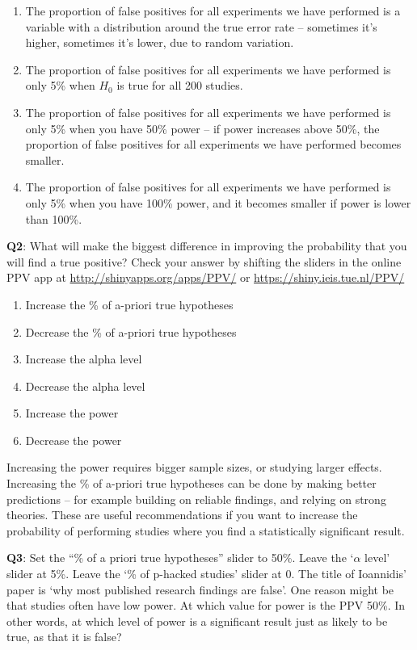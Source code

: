 \documentclass[
  oneside]{krantz}
\providecommand{\tightlist}{%
  \setlength{\itemsep}{0pt}\setlength{\parskip}{0pt}}
\begin{document}
\begin{enumerate}
\def\labelenumi{\Alph{enumi})}
\tightlist
\item
  The proportion of false positives for all experiments we have performed is a variable with a distribution around the true error rate -- sometimes it's higher, sometimes it's lower, due to random variation.
\item
  The proportion of false positives for all experiments we have performed is only 5\% when \(H_0\) is true for all 200 studies.
\item
  The proportion of false positives for all experiments we have performed is only 5\% when you have 50\% power -- if power increases above 50\%, the proportion of false positives for all experiments we have performed becomes smaller.
\item
  The proportion of false positives for all experiments we have performed is only 5\% when you have 100\% power, and it becomes smaller if power is lower than 100\%.
\end{enumerate}

\textbf{Q2}: What will make the biggest difference in improving the probability that you will find a true positive? Check your answer by shifting the sliders in the online PPV app at \url{http://shinyapps.org/apps/PPV/} or \url{https://shiny.ieis.tue.nl/PPV/}

\begin{enumerate}
\def\labelenumi{\Alph{enumi})}
\tightlist
\item
  Increase the \% of a-priori true hypotheses
\item
  Decrease the \% of a-priori true hypotheses
\item
  Increase the alpha level
\item
  Decrease the alpha level
\item
  Increase the power
\item
  Decrease the power
\end{enumerate}

Increasing the power requires bigger sample sizes, or studying larger effects. Increasing the \% of a-priori true hypotheses can be done by making better predictions -- for example building on reliable findings, and relying on strong theories. These are useful recommendations if you want to increase the probability of performing studies where you find a statistically significant result.

\textbf{Q3}: Set the ``\% of a priori true hypotheses'' slider to 50\%. Leave the `\(\alpha\) level' slider at 5\%. Leave the `\% of p-hacked studies' slider at 0. The title of Ioannidis' paper is `why most published research findings are false'. One reason might be that studies often have low power. At which value for power is the PPV 50\%. In other words, at which level of power is a significant result just as likely to be true, as that it is false?
\end{document}
